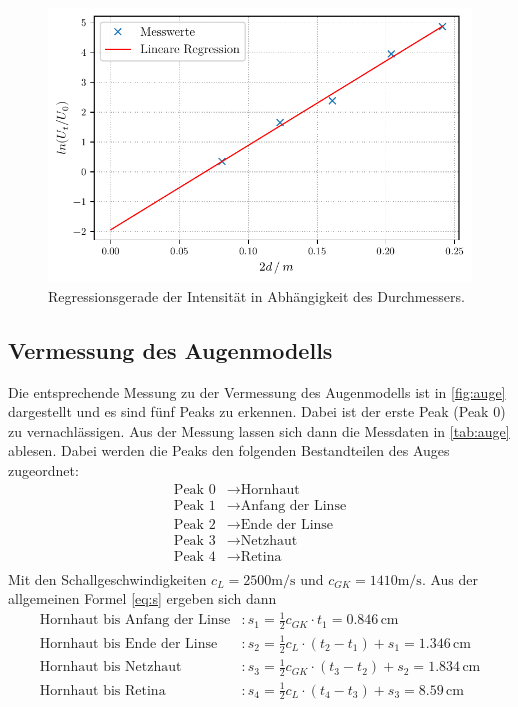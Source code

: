 \begin{figure}
  \centering
  \includegraphics[width = 0.7\linewidth]{build/plot3.pdf}
  \caption{Regressionsgerade der Intensität in Abhängigkeit des Durchmessers.}
  \label{fig:plot3}
\end{figure}

\subsection{Vermessung des Augenmodells}

Die entsprechende Messung zu der Vermessung des Augenmodells ist in \autoref{fig:auge} dargestellt
und es sind fünf Peaks zu erkennen. Dabei ist der erste Peak (Peak 0) zu vernachlässigen.
Aus der Messung lassen sich dann die Messdaten in \autoref{tab:auge} ablesen.
Dabei werden die Peaks den folgenden Bestandteilen des Auges zugeordnet:
\begin{align*}
  \text{Peak 0} &\to \text{Hornhaut} \\
  \text{Peak 1} &\to \text{Anfang der Linse} \\
  \text{Peak 2} &\to \text{Ende der Linse} \\
  \text{Peak 3} &\to \text{Netzhaut} \\
  \text{Peak 4} &\to \text{Retina} \\  
\end{align*}
Mit den Schallgeschwindigkeiten $c_L = 2500 \unit{\meter / \second}$ und $c_{GK} = 1410 \unit{\meter / \second}$.
Aus der allgemeinen Formel \ref{eq:s} ergeben sich dann
\begin{align*}
  \text{Hornhaut bis Anfang der Linse}&: s_1 = \frac{1}{2} c_{GK} \cdot t_1 = 0.846 \, \unit{\centi\meter} \\
  \text{Hornhaut bis Ende der Linse}&: s_2 = \frac{1}{2} c_L \cdot (t_2 - t_1) + s_1 = 1.346 \, \unit{\centi\meter} \\
  \text{Hornhaut bis Netzhaut}&: s_3 = \frac{1}{2} c_{GK} \cdot (t_3 - t_2) + s_2 = 1.834 \, \unit{\centi\meter} \\
  \text{Hornhaut bis Retina}&: s_4 = \frac{1}{2} c_{L} \cdot (t_4 - t_3) + s_3 = 8.59 \, \unit{\centi\meter} 
\end{align*}


